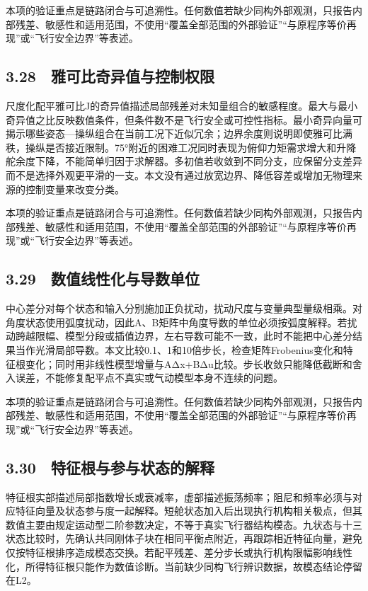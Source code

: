 \documentclass[UTF8,12pt,openany]{ctexbook}
\begin{document}
本项的验证重点是链路闭合与可追溯性。任何数值若缺少同构外部观测，只报告内部残差、敏感性和适用范围，不使用“覆盖全部范围的外部验证”“与原程序等价再现”或“飞行安全边界”等表述。

\subsection{3.28　雅可比奇异值与控制权限}

尺度化配平雅可比J的奇异值描述局部残差对未知量组合的敏感程度。最大与最小奇异值之比反映数值条件，但条件数不是飞行安全或可控性指标。最小奇异向量可揭示哪些姿态—操纵组合在当前工况下近似冗余；边界余度则说明即使雅可比满秩，操纵是否接近限制。75°附近的困难工况同时表现为俯仰力矩需求增大和升降舵余度下降，不能简单归因于求解器。多初值若收敛到不同分支，应保留分支差异而不是选择外观更平滑的一支。本文没有通过放宽边界、降低容差或增加无物理来源的控制变量来改变分类。

本项的验证重点是链路闭合与可追溯性。任何数值若缺少同构外部观测，只报告内部残差、敏感性和适用范围，不使用“覆盖全部范围的外部验证”“与原程序等价再现”或“飞行安全边界”等表述。

\subsection{3.29　数值线性化与导数单位}

中心差分对每个状态和输入分别施加正负扰动，扰动尺度与变量典型量级相乘。对角度状态使用弧度扰动，因此A、B矩阵中角度导数的单位必须按弧度解释。若扰动跨越限幅、模型分段或插值边界，左右导数可能不一致，此时不能把中心差分结果当作光滑局部导数。本文比较0.1、1和10倍步长，检查矩阵Frobenius变化和特征根变化；同时用非线性模型增量与AΔx+BΔu比较。步长收敛只能降低截断和舍入误差，不能修复配平点不真实或气动模型本身不连续的问题。

本项的验证重点是链路闭合与可追溯性。任何数值若缺少同构外部观测，只报告内部残差、敏感性和适用范围，不使用“覆盖全部范围的外部验证”“与原程序等价再现”或“飞行安全边界”等表述。

\subsection{3.30　特征根与参与状态的解释}

特征根实部描述局部指数增长或衰减率，虚部描述振荡频率；阻尼和频率必须与对应特征向量及状态参与度一起解释。短舱状态加入后出现执行机构相关极点，但其数值主要由规定运动型二阶参数决定，不等于真实飞行器结构模态。九状态与十三状态比较时，先确认共同刚体子块在相同平衡点附近，再跟踪相近特征向量，避免仅按特征根排序造成模态交换。若配平残差、差分步长或执行机构限幅影响线性化，所得特征根只能作为数值诊断。当前缺少同构飞行辨识数据，故模态结论停留在L2。
\end{document}
